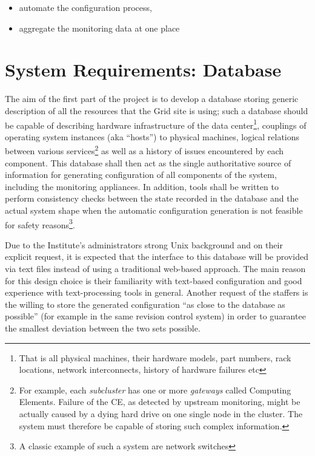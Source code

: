 \documentclass[12pt]{article}
\begin{document}
\begin{itemize}
    \item{automate the configuration process,}
    \item{aggregate the monitoring data at one place}
\end{itemize}

\section{System Requirements: Database}

The aim of the first part of the project is to develop a database storing generic description of all the resources that the Grid
site is using; such a database should be capable of describing hardware infrastructure of the data center\footnote{That is all
physical machines, their hardware models, part numbers, rack locations, network interconnects, history of hardware failures etc},
couplings of operating system instances (aka ``hosts'') to physical machines, logical relations between various
services\footnote{For example, each {\em subcluster} has one or more {\em gateways} called Computing Elements.  Failure of the CE,
as detected by upstream monitoring, might be actually caused by a dying hard drive on one single node in the cluster.  The system
must therefore be capable of storing such complex information.} as well as a history of issues encountered by each component.
This database shall then act as the single authoritative source of information for generating configuration of all components of
the system, including the monitoring appliances.  In addition, tools shall be written to perform consistency checks between the
state recorded in the database and the actual system shape when the automatic configuration generation is not feasible for safety
reasons\footnote{A classic example of such a system are network switches}.

Due to the Institute's administrators strong Unix background and on their explicit request, it is expected that the interface to
this database will be provided via text files instead of using a traditional web-based approach.  The main reason for this design
choice is their familiarity with text-based configuration and good experience with text-processing tools in general.  Another
request of the staffers is the willing to store the generated configuration ``as close to the database as possible'' (for example
in the same revision control system) in order to guarantee the smallest deviation between the two sets possible.
\end{document}
